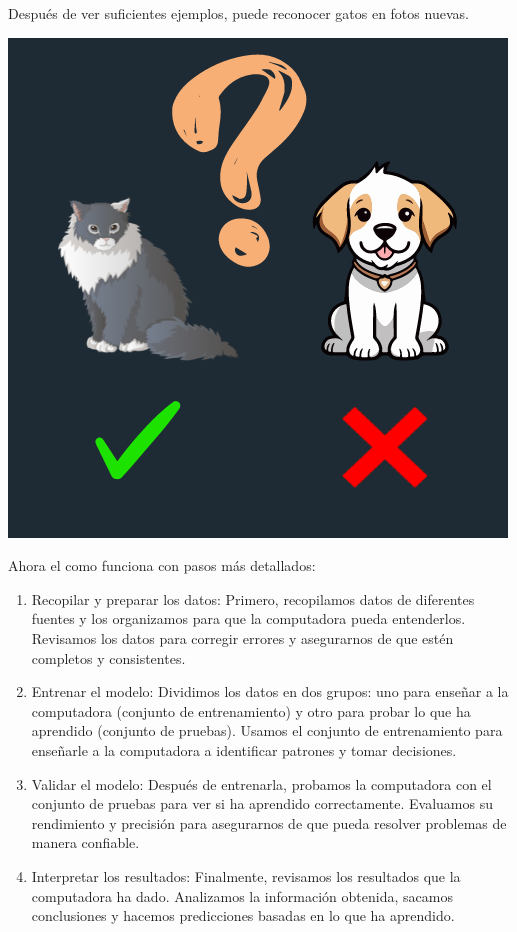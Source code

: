 Después de ver suficientes ejemplos, puede reconocer gatos en fotos nuevas.

\begin{center}
    \includegraphics[scale = .5]{assets/imagenes/modulo05/step03.png}
\end{center}

Ahora el como funciona con pasos más detallados:
\begin{enumerate}
    \item Recopilar y preparar los datos: Primero, recopilamos datos de diferentes fuentes 
    y los organizamos para que la computadora pueda entenderlos. Revisamos los datos para 
    corregir errores y asegurarnos de que estén completos y consistentes.

    \item Entrenar el modelo: Dividimos los datos en dos grupos: uno para enseñar a la 
    computadora (conjunto de entrenamiento) y otro para probar lo que ha aprendido 
    (conjunto de pruebas). Usamos el conjunto de entrenamiento para enseñarle a la 
    computadora a identificar patrones y tomar decisiones.
    
    \item Validar el modelo: Después de entrenarla, probamos la computadora con el conjunto 
    de pruebas para ver si ha aprendido correctamente. Evaluamos su rendimiento y precisión 
    para asegurarnos de que pueda resolver problemas de manera confiable.
    
    \item Interpretar los resultados: Finalmente, revisamos los resultados que la computadora 
    ha dado. Analizamos la información obtenida, sacamos conclusiones y hacemos predicciones 
    basadas en lo que ha aprendido.
\end{enumerate}


